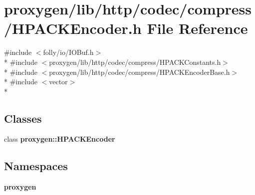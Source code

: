 \section{proxygen/lib/http/codec/compress/\+H\+P\+A\+C\+K\+Encoder.h File Reference}
\label{HPACKEncoder_8h}
{\ttfamily \#include $<$folly/io/\+I\+O\+Buf.\+h$>$}\\*
{\ttfamily \#include $<$proxygen/lib/http/codec/compress/\+H\+P\+A\+C\+K\+Constants.\+h$>$}\\*
{\ttfamily \#include $<$proxygen/lib/http/codec/compress/\+H\+P\+A\+C\+K\+Encoder\+Base.\+h$>$}\\*
{\ttfamily \#include $<$vector$>$}\\*
\subsection*{Classes}
\begin{DoxyCompactItemize}
\item 
class {\bf proxygen\+::\+H\+P\+A\+C\+K\+Encoder}
\end{DoxyCompactItemize}
\subsection*{Namespaces}
\begin{DoxyCompactItemize}
\item 
 {\bf proxygen}
\end{DoxyCompactItemize}
